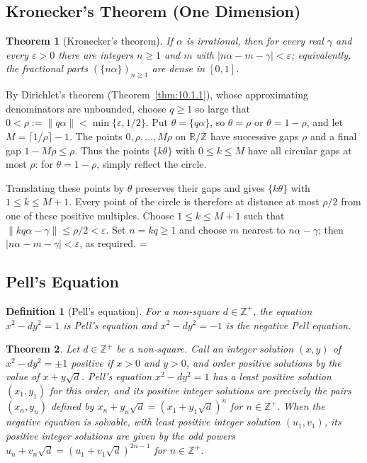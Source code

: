 \documentclass[11pt]{article}
\makeatletter
\theoremstyle{ntstyle}
\newtheorem{theorem}{Theorem}[subsection]
\newtheorem{definition}{Definition}[subsection]
\let\nt@closedisplay\]
\def\nt@guardedclose{\@ifnextchar\par{\nt@closeafterpar}{\@ifnextchar\end{\postdisplaypenalty\@M\nt@closedisplay}{\nt@closedisplay}}}
\def\nt@closeafterpar\par{\@ifnextchar\par{\nt@closeafterpar}{\@ifnextchar\end{\postdisplaypenalty\@M\nt@closedisplay\par}{\nt@closedisplay\par}}}
\renewenvironment{proof}[1][\proofname]{\par
  \pushQED{\qed}\normalfont\topsep\medskipamount\edef\nt@afterproof{\@endparpenalty=\the\@endparpenalty\relax}\@beginparpenalty\@M\@endparpenalty\@M\let\]\nt@guardedclose\trivlist\item[]\textit{#1\@addpunct{.}} \ignorespaces}{\ifvmode\addpenalty\@M\fi\popQED\nt@afterproof\endtrivlist\@endpefalse}
\makeatother
\begin{document}
\subsection{Kronecker's Theorem (One Dimension)}

\begin{theorem}[Kronecker's theorem]\label{thm:10.6.1} If $\alpha$ is
	irrational, then for every real $\gamma$ and every $\varepsilon>0$
	there are integers $n\ge1$ and $m$ with
	$|n\alpha-m-\gamma|<\varepsilon$; equivalently, the fractional parts
	$(\{n\alpha\})_{n\ge1}$ are dense in $[0,1]$.
\end{theorem}

\begin{proof} By Dirichlet's theorem (Theorem~\ref{thm:10.1.1}), whose
	approximating denominators are unbounded, choose $q\ge1$ so large that $0<\rho:=\lVert
	q\alpha\rVert<\min\{\varepsilon,1/2\}$.
	Put $\theta=\{q\alpha\}$, so $\theta=\rho$ or $\theta=1-\rho$,
	and let $M=\lceil1/\rho\rceil-1$.
	The points $0,\rho,\ldots,M\rho$ on $\mathbb{R}/\mathbb{Z}$
	have successive gaps $\rho$ and a final gap $1-M\rho\le\rho$.
	Thus the points $\{k\theta\}$ with $0\le k\le M$ have all circular gaps
	at most $\rho$: for $\theta=1-\rho$, simply reflect the circle.

	Translating these points by $\theta$ preserves their gaps and gives
	$\{k\theta\}$ with $1\le k\le M+1$. Every point of the circle is
	therefore at distance at most $\rho/2$ from one of these positive
	multiples. Choose $1\le k\le M+1$ such that
	$\lVert kq\alpha-\gamma\rVert\le\rho/2<\varepsilon$.
	Set $n=kq\ge1$ and choose $m$ nearest to $n\alpha-\gamma$; then
	$|n\alpha-m-\gamma|<\varepsilon$, as required.
\end{proof}
\subsection{Pell's Equation}

\begin{definition}[Pell's equation]\label{def:10.7.1} For a non-square
	$d\in\mathbb{Z}^+$, the equation $x^2-dy^2=1$ is Pell's equation and $x^2-dy^2=-1$
	is the negative Pell equation.
\end{definition}
\begin{theorem}\label{thm:10.7.1} Let $d\in\mathbb{Z}^+$ be a non-square.
	Call an integer solution $(x,y)$ of $x^2-dy^2=\pm1$ positive if $x>0$ and $y>0$, and
	order positive solutions by the value of $x+y\sqrt{d}$.
	Pell's equation $x^2-dy^2=1$ has a least positive solution $(x_1,y_1)$ for this order,
	and its positive integer solutions are precisely the pairs $(x_n,y_n)$
	defined by
	$x_n+y_n\sqrt{d}=(x_1+y_1\sqrt{d})^{n}$ for $n\in\mathbb{Z}^+$.
	When the negative equation is solvable,
	with least positive integer solution $(u_1,v_1)$, its positive integer
	solutions are given by the odd powers $u_n+v_n\sqrt
		{d}=(u_1+v_1\sqrt{d})^{2n-1}$ for $n\in\mathbb{Z}^+$.
\end{theorem}
\end{document}
